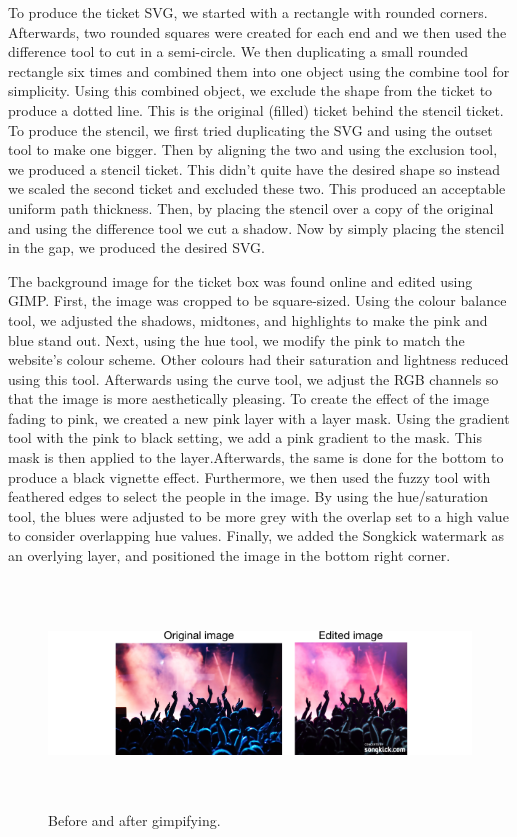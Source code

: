 \documentclass[10pt]{article}
\begin{document}
                To produce the ticket SVG, we started with a rectangle with rounded corners. Afterwards, two rounded squares were created for each end and we then used the difference tool to cut in a semi-circle. We then duplicating a small rounded rectangle six times and combined them into one object using the combine tool for simplicity. Using this combined object, we exclude the shape from the ticket to produce a dotted line. This is the original (filled) ticket behind the stencil ticket. To produce the stencil, we first tried duplicating the SVG and using the outset tool to make one bigger. Then by aligning the two and using the exclusion tool, we produced a stencil ticket. This didn't quite have the desired shape so instead we scaled the second ticket and excluded these two. This produced an acceptable uniform path thickness. Then, by placing the stencil over a copy of the original and using the difference tool we cut a shadow. Now by simply placing the stencil in the gap, we produced the desired SVG. 

                The background image for the ticket box was found online and edited using GIMP. First, the image was cropped to be square-sized. Using the colour balance tool, we adjusted the shadows, midtones, and highlights to make the pink and blue stand out. Next, using the hue tool, we modify the pink to match the website's colour scheme. Other colours had their saturation and lightness reduced using this tool. Afterwards using the curve tool, we adjust the RGB channels so that the image is more aesthetically pleasing. To create the effect of the image fading to pink, we created a new pink layer with a layer mask. Using the gradient tool with the pink to black setting, we add a pink gradient to the mask. This mask is then applied to the layer.Afterwards, the same is done for the bottom to produce a black vignette effect. Furthermore, we then used the fuzzy tool with feathered edges to select the people in the image. By using the hue/saturation tool, the blues were adjusted to be more grey with the overlap set to a high value to consider overlapping hue values. Finally, we added the Songkick watermark as an overlying layer, and positioned the image in the bottom right corner.

                \begin{figure}[!ht]
                  \centering
                      \includegraphics[height=60mm]{example2.png}
                  \caption{Before and after gimpifying.}
                \end{figure}
\end{document}
